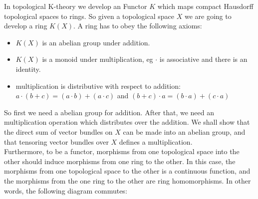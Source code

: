 \documentclass[../Thesis.tex]{subfiles}
\begin{document}
In topological K-theory we develop an Functor $K$ which maps compact Hausdorff topological spaces to rings. So given a topological space $X$ we are going to develop a ring $K(X)$. A ring has to obey the following axioms:
\begin{itemize}
\item $K(X)$ is an abelian group under addition.
\item $K(X)$ is a monoid under multiplication, eg $\cdot$ is associative and there is an identity.
\item multiplication is distributive with respect to addition: $a\cdot ( b+c) = (a\cdot b) + (a \cdot c)$ and $(b+c)\cdot a = (b\cdot a) + (c \cdot a)$
\end{itemize}

So first we need a abelian group for addition. After that, we need an multiplication operation which distributes over the addition. We shall show that the direct sum of vector bundles on $X$ can be made into an abelian group, and that tensoring vector bundles over $X$ defines a multiplication.
\\Furthermore, to be a functor, morphisms from one topological space into the other should induce morphisms from one ring to the other. In this case, the morphisms from one topological space to the other is a continuous function, and the morphisms from the one ring to the other are ring homomorphisms. In other words, the following diagram commutes:\\\newline

\end{document}
